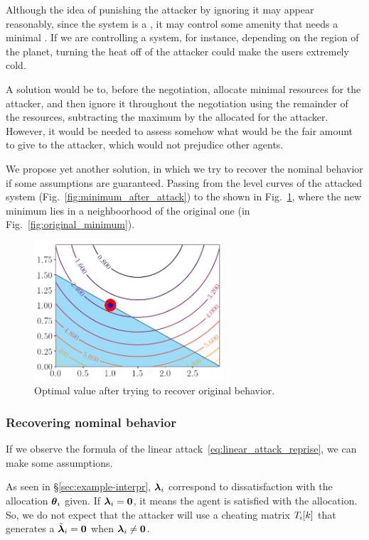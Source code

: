 \documentclass[../main.tex]{subfiles}
\begin{document}
Although the idea of punishing the attacker by ignoring it may appear reasonably, since the system is a \cps{}, it may control some amenity that needs a minimal \QoS{}.
If we are controlling a \HVAC{} system, for instance, depending on the region of the planet, turning the heat off of the attacker could make the users extremely cold.

A solution would be to, before the negotiation, allocate minimal resources for the attacker, and then ignore it throughout the negotiation using the remainder of the resources, subtracting the maximum by the allocated for the attacker.
However, it would be needed to assess somehow what would be the fair amount to give to the attacker, which would not prejudice other agents.

We propose yet another solution, in which we try to recover the nominal behavior if some assumptions are guaranteed.
Passing from the level curves of the attacked system (Fig.~\ref{fig:minimum_after_attack}) to the shown in Fig.~\ref{fig:minimum_recovered}, where the new minimum lies in a neighboorhood of the original one (in Fig.~\ref{fig:original_minimum}).

\begin{figure}[h]
  \centering
  \includegraphics[width=7cm]{../img/resilient_eq/correctX.png}
  \caption{Optimal value after trying to recover original behavior.}\label{fig:minimum_recovered}
\end{figure}

\subsubsection{Recovering nominal behavior}\label{sec:recov-nomin-behav}
If we observe the formula of the linear attack~\eqref{eq:linear_attack_reprise}, we can make some assumptions.

As seen in \S\ref{sec:example-interpr}, $\boldsymbol{\lambda}_i$ correspond to dissatisfaction with the allocation $\boldsymbol{\theta}_i$ given.
If $\boldsymbol{\lambda}_i=\mathbf{0}$, it means the agent is satisfied with the allocation.
So, we do not expect that the attacker will use a cheating matrix $T_{i}[k]$ that generates a $\tilde{\boldsymbol{\lambda}}_{i}=\mathbf{0}$ when $\boldsymbol{\lambda}_i\neq\mathbf{0}$.
\end{document}
